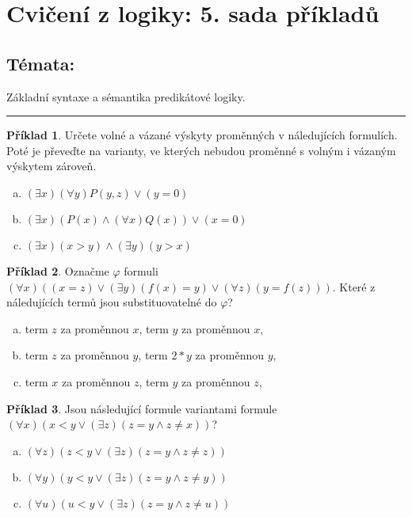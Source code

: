 \documentclass{amsart}
\theoremstyle{definition}
\newtheorem{problem}{Příklad}
\begin{document}
\section*{Cvičení z logiky: 5. sada příkladů}

\bigskip\bigskip\bigskip

\subsection*{Témata:} Základní syntaxe a sémantika predikátové logiky.

\bigskip\hrule

\bigskip\begin{problem}
Určete volné a vázané výskyty proměnných v náledujících formulích. Poté je převeďte na varianty, ve kterých nebudou proměnné s volným i vázaným výskytem zároveň.
\begin{enumerate}[(a)]
   \item $(\exists x)(\forall y)P(y,z) \vee (y=0)$
   \item $(\exists x)(P(x) \wedge (\forall x)Q(x)) \vee (x=0)$
   \item $(\exists x)(x>y) \wedge (\exists y)(y>x)$
\end{enumerate}
\end{problem}

\bigskip\begin{problem}
Označme $\varphi$ formuli $(\forall x)((x=z) \vee (\exists y)(f(x)=y) \vee (\forall z)(y=f(z)))$. Které z náledujících termů jsou substituovatelné do $\varphi$?
\begin{enumerate}[(a)]
   \item term $z$ za proměnnou $x$, term $y$ za proměnnou $x$,
   \item term $z$ za proměnnou $y$, term $2*y$ za proměnnou $y$,
   \item term $x$ za proměnnou $z$, term $y$ za proměnnou $z$,
\end{enumerate}
\end{problem}

\bigskip\begin{problem}
Jsou následující formule variantami formule $(\forall x)(x<y \vee (\exists z)(z=y \wedge z\ne x))$?
\begin{enumerate}[(a)]
\item $(\forall z)(z<y \vee (\exists z)(z=y \wedge z\ne z))$
\item $(\forall y)(y<y \vee (\exists z)(z=y \wedge z\ne y))$
\item $(\forall u)(u<y \vee (\exists z)(z=y \wedge z\ne u))$
\end{enumerate}
\end{problem}
\end{document}
